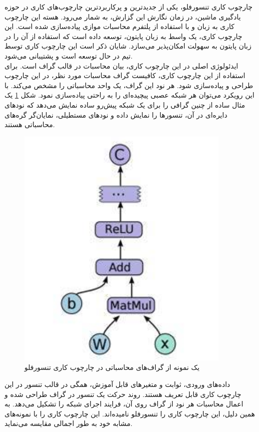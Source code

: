 چارچوب کاری تنسورفلو، یکی از جدیدترین و پرکاربردترین چارچوب‌های کاری در حوزه یادگیری ماشین، در زمان نگارش این گزارش، به شمار می‌رود. هسته این چارچوب کاری به زبان  و با استفاده از پلتفرم محاسبات موازی  پیاده‌سازی شده است. این چارچوب کاری، یک واسط به زبان پایتون، توسعه داده است که استفاده از آن را در زبان پایتون به سهولت امکان‌پذیر می‌سازد. شایان ذکر است این چارچوب کاری توسط تیم  در حال توسعه است و پشتیبانی می‌شود.
\\
ایدئولوژی اصلی در این چارچوب کاری، بیان محاسبات در قالب گراف‌ است. برای استفاده از این چارچوب کاری، کافیست گراف محاسبات مورد نظر، در این چارچوب طراحی و پیاده‌سازی شود. هر نود این گراف، یک واحد محاسباتی را مشخص می‌کند. با این رویکرد می‌توان هر شبکه عصبی پیچیده‌ای را به راحتی پیاده‌سازی نمود. شکل \ref{fig:tensor} یک مثال ساده از چنین گرافی را برای یک شبکه پیش‌رو ساده نمایش می‌دهد که نودهای دایره‌ای در آن، تنسورها را نمایش داده و نودهای مستطیلی، نمایان‌گر گره‌های محاسباتی هستند.
\begin{figure}[h]
	\centering
	\includegraphics[scale=0.4]{Imgs/tensorsamp.png}
	\caption{یک نمونه از گراف‌های محاسباتی در چارچوب کاری تنسورفلو}
	\label{fig:tensor}
\end{figure}

داده‌های ورودی، ثوابت و متغیر‌های قابل آموزش، همگی در قالب تنسور در این چارچوب کاری قابل تعریف هستند. روند حرکت یک تنسور در گراف طراحی شده و اعمال محاسبات هر نود از گراف روی آن، فرایند اجرای شبکه را تشکیل می‌دهد. به همین دلیل، این چارچوب کاری را تنسورفلو نامیده‌اند. 
این چارچوب کاری را با نمونه‌های مشابه خود به طور اجمالی مقایسه می‌نماید.


